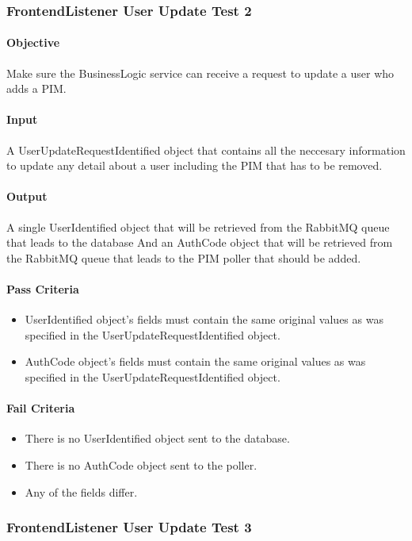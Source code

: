 \documentclass[hidelinks,english]{article}
\begin{document}
			\subsubsection{FrontendListener User Update Test 2}\label{businessfrontendlistenerupdatetest2}
				\paragraph{Objective} Make sure the BusinessLogic service can receive a request to update a user who adds a PIM.
				\paragraph{Input} A UserUpdateRequestIdentified object that contains all the neccesary information to update any detail about a user including the PIM that has to be removed.
				\paragraph{Output} A single UserIdentified object that will be retrieved from the RabbitMQ queue that leads to the database And an AuthCode object that  will be retrieved from the RabbitMQ queue that leads to the PIM poller that should be added.
				\paragraph{Pass Criteria}
				\begin{itemize}
					\item UserIdentified object's fields must contain the same original values as was specified in the UserUpdateRequestIdentified object.
					\item AuthCode object's fields must contain the same original values as was specified in the UserUpdateRequestIdentified object.
				\end{itemize}
				\paragraph{Fail Criteria}
				\begin{itemize}
					\item There is no UserIdentified object sent to the database.
					\item There is no AuthCode object sent to the poller.
					\item Any of the fields differ.
				\end{itemize}
			
			\subsubsection{FrontendListener User Update Test 3}\label{businessfrontendlistenerupdatetest3}
\end{document}
